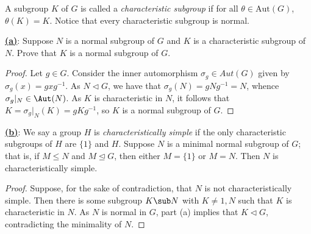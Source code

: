 \documentclass[12pt]{article}
\begin{document}
\begin{homeworkProblem}
  A subgroup $K$ of $G$ is called a \emph{characteristic subgroup} if for all $\theta \in \mathrm{Aut}(G)$, $\theta(K) = K$. Notice that every characteristic subgroup is normal.  

  \underline{\textbf{(a)}}: Suppose $N$ is a normal subgroup of $G$ and $K$ is a characteristic subgroup of $N$. Prove that $K$ is a normal subgroup of $G$.  
  
  \begin{proof}
    Let $ g\in G $. Consider the inner automorphism $ \sigma_{g}\in Aut(G) $ given by $ \sigma_{g}(x) = gxg^{-1} $. As $ N\triangleleft G $, we have that $ \sigma_{g}(N) = gNg^{-1} = N $, whence $ \sigma_{g}\vert_{N}\in \Aut(N) $. As $ K $ is characteristic in $ N $, it follows that $ K = \sigma_{g}\vert_{N}(K) = gKg^{-1} $, so $ K $ is a normal subgroup of $ G $.
  \end{proof}

  \underline{\textbf{(b)}}: We say a group $H$ is \emph{characteristically simple} if the only characteristic subgroups of $H$ are $\{1\}$ and $H$. Suppose $N$ is a minimal normal subgroup of $G$; that is, if $M \leq N$ and $M \trianglelefteq G$, then either $M = \{1\}$ or $M = N$. Then $N$ is characteristically simple.

  \begin{proof}
    Suppose, for the sake of contradiction, that $ N $ is not characteristically simple. Then there is some subgroup $ K\sub N $ with $ K\neq 1, N $ such that $ K $ is characteristic in $ N $. As $ N $ is normal in $ G $, part (a) implies that $ K \triangleleft G$, contradicting the minimality of $ N $.
  \end{proof}
\end{homeworkProblem}
\end{document}

